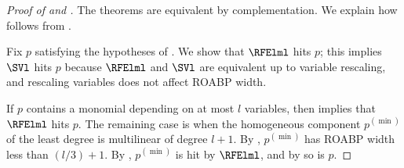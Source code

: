 \begin{proof}[Proof of  and ]
  The theorems are equivalent by complementation. We explain how  follows from .

  \def\pdn{p^{(\min)}}
  Fix \(p\) satisfying the hypotheses of .
  We show that \(\RFElml\) hits \(p\);
  this implies \(\SVl\) hits \(p\) because \(\RFElml\) and \(\SVl\) are
  equivalent up to variable rescaling, and rescaling variables does not affect
  ROABP width.

  If $p$ contains a monomial depending on at most $l$ variables, then  implies that $\RFElml$ hits $p$. The remaining case is when the homogeneous component $\pdn$ of the least degree is multilinear of degree $l+1$. By , $\pdn$ has ROABP width less than $(l/3)+1$. By , $\pdn$ is hit by $\RFElml$, and by  so is $p$.
\end{proof}